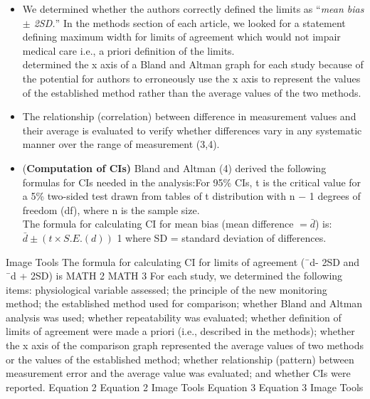 \documentclass[MAIN.tex]{subfiles}
\begin{document}
\begin{itemize}
		\item We determined whether the authors correctly defined the limits as “\textit{mean bias $\pm$ 2SD.}” In the methods section of each article, we looked for a statement defining maximum width for limits of agreement which would not impair medical care i.e., a priori definition of the limits. \\  determined the x axis of a Bland and Altman graph for each study because of the potential for authors to erroneously use the x axis to represent the values of the established method rather than the average values of the two methods. 
		
		\item The relationship (correlation) between difference in measurement values and their average is evaluated to verify whether differences vary in any systematic manner over the range of measurement (3,4).
		\item (\textbf{Computation of CIs)} Bland and Altman (4) derived the following formulas for CIs needed in the analysis:For 95\% CIs, t is the critical value for a 5\% two-sided test drawn from tables of t distribution with n − 1 degrees of freedom (df), where n is the sample size. \\ The formula for calculating CI for mean bias (mean difference $=\bar{d}$) is:$\bar{d} \pm (t \times S.E.(d))$ 1 where SD = standard deviation of differences.
	\end{itemize}
	Image Tools
	The formula for calculating CI for limits of agreement (¯d- 2SD and ¯d + 2SD) is MATH 2 MATH 3 For each study, we determined the following items: physiological variable assessed; the principle of the new monitoring method; the established method used for comparison; whether Bland and Altman analysis was used; whether repeatability was evaluated; whether definition of limits of agreement were made a priori (i.e., described in the methods); whether the x axis of the comparison graph represented the average values of two methods or the values of the established method; whether relationship (pattern) between measurement error and the average value was evaluated; and whether CIs were reported.
	Equation 2
	Equation 2
	Image Tools	Equation 3
	Equation 3
	Image Tools
	\newpage
\end{document}
